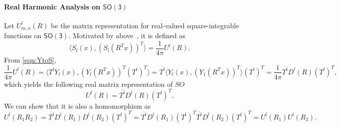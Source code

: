 \documentclass[onecolumn,11pt]{IEEEtran}
\newcommand{\pair}[1]{\ensuremath{\langle #1 \rangle}}
\newcommand{\SO}{\ensuremath{\mathsf{SO(3)}}}
\begin{document}
\paragraph{Real Harmonic Analysis on $\SO$}
Let $U^l_{m,n}(R)$ be the matrix representation for  real-valued square-integrable functions on $\SO$. 
Motivated by above~\cite{BlaFloJMS97}, it is defined as
\[
    \pair{ S_l(x), (S_l(R^Tx))^T } = \frac{1}{4\pi} U^l(R).
\]
From \eqref{eqn:YtoS},
\[
\frac{1}{4\pi} U^l(R) = \pair{ T^l Y_l(x),  (Y_l(R^T x))^T (T^l)^T } 
= \overline{T^l} \pair{ Y_l(x), (Y_1(R^T x))^T} (T^l)^T
= \frac{1}{4\pi} \overline{T^l} D^l(R) (T^l)^T,
\]
which yields the following real matrix representation of $SO$
\begin{equation}
    U^l (R) = \overline{T^l} D^l(R) (T^l)^T.\label{eqn:Ul}
\end{equation}
We can show that it is also a homomorphism as
\[
    U^l( R_1 R_2) = \overline{T^l} D^l(R_1)D^l(R_2)  (T^l)^T
    =\overline{T^l} D^l(R_1) (T^l)^T  \overline{T^l} D^l(R_2)  (T^l)^T
    = U^l(R_1) U^l(R_2).
\]
\end{document}
